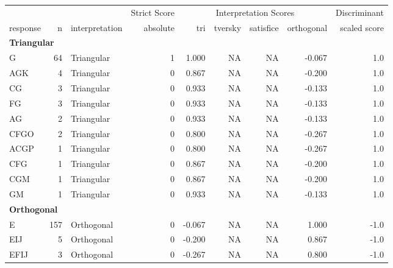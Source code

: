 \documentclass[
  letterpaper,
  DIV=11,
  numbers=noendperiod]{scrreprt}
\begin{document}
\begin{tabular}[t]{l|r|l|r|r|r|r|r|r}
\hline
\multicolumn{3}{c|}{ } & \multicolumn{1}{c|}{Strict Score} & \multicolumn{4}{c|}{Interpretation Scores} & \multicolumn{1}{c}{Discriminant} \\
\cline{4-4} \cline{5-8} \cline{9-9}
response & n & interpretation & absolute & tri & tversky & satisfice & orthogonal & scaled score\\
\hline
\multicolumn{9}{l}{\textbf{Triangular}}\\
\hline
\hspace{1em}G & 64 & Triangular & 1 & 1.000 & NA & NA & -0.067 & 1.0\\
\hline
\hspace{1em}AGK & 4 & Triangular & 0 & 0.867 & NA & NA & -0.200 & 1.0\\
\hline
\hspace{1em}CG & 3 & Triangular & 0 & 0.933 & NA & NA & -0.133 & 1.0\\
\hline
\hspace{1em}FG & 3 & Triangular & 0 & 0.933 & NA & NA & -0.133 & 1.0\\
\hline
\hspace{1em}AG & 2 & Triangular & 0 & 0.933 & NA & NA & -0.133 & 1.0\\
\hline
\hspace{1em}CFGO & 2 & Triangular & 0 & 0.800 & NA & NA & -0.267 & 1.0\\
\hline
\hspace{1em}ACGP & 1 & Triangular & 0 & 0.800 & NA & NA & -0.267 & 1.0\\
\hline
\hspace{1em}CFG & 1 & Triangular & 0 & 0.867 & NA & NA & -0.200 & 1.0\\
\hline
\hspace{1em}CGM & 1 & Triangular & 0 & 0.867 & NA & NA & -0.200 & 1.0\\
\hline
\hspace{1em}GM & 1 & Triangular & 0 & 0.933 & NA & NA & -0.133 & 1.0\\
\hline
\multicolumn{9}{l}{\textbf{Orthogonal}}\\
\hline
\hspace{1em}E & 157 & Orthogonal & 0 & -0.067 & NA & NA & 1.000 & -1.0\\
\hline
\hspace{1em}EIJ & 5 & Orthogonal & 0 & -0.200 & NA & NA & 0.867 & -1.0\\
\hline
\hspace{1em}EFIJ & 3 & Orthogonal & 0 & -0.267 & NA & NA & 0.800 & -1.0\\

\end{tabular}
\end{document}
